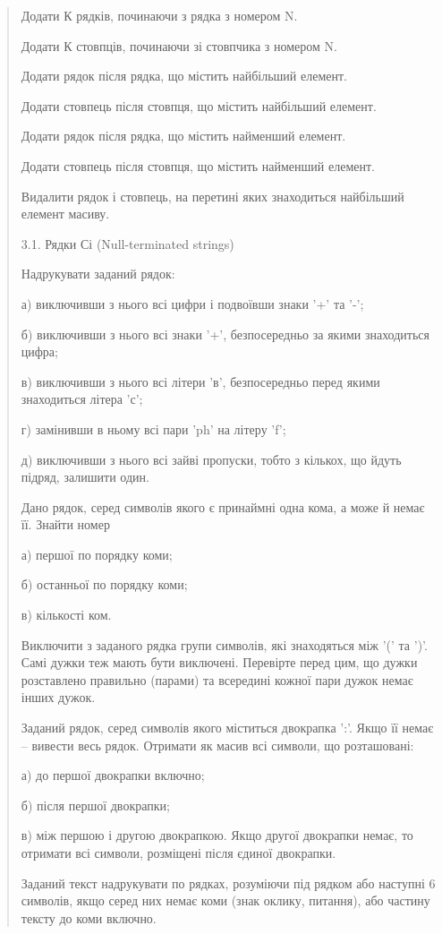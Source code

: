 \documentclass[]{article}
\begin{document}
\begin{quote}
Додати К рядків, починаючи з рядка з номером N.

Додати К стовпців, починаючи зі стовпчика з номером N.

Додати рядок після рядка, що містить найбільший елемент.

Додати стовпець після стовпця, що містить найбільший елемент.

Додати рядок після рядка, що містить найменший елемент.

Додати стовпець після стовпця, що містить найменший елемент.

Видалити рядок і стовпець, на перетині яких знаходиться найбільший
елемент масиву.

\protect\hypertarget{_Hlk48903540}{}{}3.1. Рядки Сі (Null-terminated
strings)

Надрукувати заданий рядок:

а) виключивши з нього всі цифри і подвоївши знаки '+' та '-';

б) виключивши з нього всі знаки '+', безпосередньо за якими знаходиться
цифра;

в) виключивши з нього всі літери 'в', безпосередньо перед якими
знаходиться літера 'с';

г) замінивши в ньому всі пари 'ph' на літеру 'f';

д) виключивши з нього всі зайві пропуски, тобто з кількох, що йдуть
підряд, залишити один.

Дано рядок, серед символів якого є принаймні одна кома, а може й немає
її. Знайти номер

а) першої по порядку коми;

б) останньої по порядку коми;

в) кількості ком.

Виключити з заданого рядка групи символів, які знаходяться між '(' та
')'. Самі дужки теж мають бути виключені. Перевірте перед цим, що дужки
розставлено правильно (парами) та всередині кожної пари дужок немає
інших дужок.

Заданий рядок, серед символів якого міститься двокрапка ':'. Якщо її
немає -- вивести весь рядок. Отримати як масив всі символи, що
розташовані:

а) до першої двокрапки включно;

б) після першої двокрапки;

в) між першою і другою двокрапкою. Якщо другої двокрапки немає, то
отримати всі символи, розміщені після єдиної двокрапки.

Заданий текст надрукувати по рядках, розуміючи під рядком або наступні 6
символів, якщо серед них немає коми (знак оклику, питання), або частину
тексту до коми включно.


\end{quote}
\end{document}
